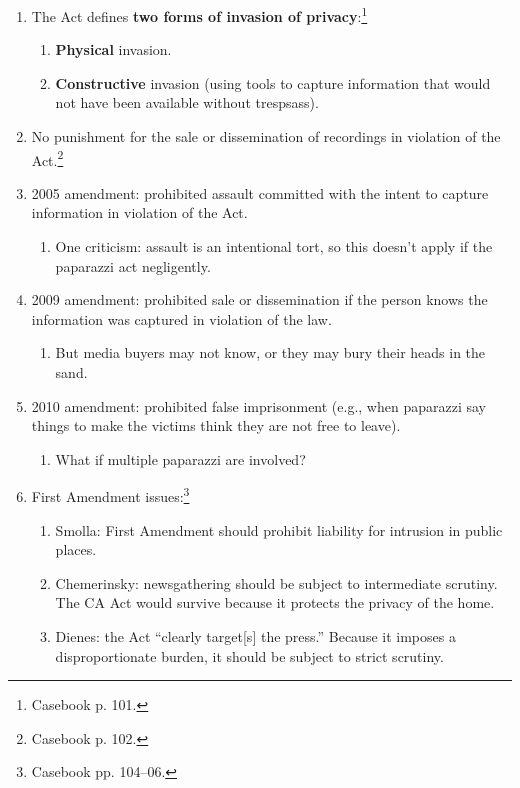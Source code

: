 \begin{enumerate}
    \item The Act defines \textbf{two forms of invasion of 
    privacy}:\footnote{Casebook p.  101.}
    \begin{enumerate}
        \item \textbf{Physical} invasion.
        \item \textbf{Constructive} invasion (using tools to capture information 
        that would not have been available without trespsass).
    \end{enumerate}
    \item No punishment for the sale or dissemination of recordings in violation 
    of the Act.\footnote{Casebook p. 102.}
    \item 2005 amendment: prohibited assault committed with the intent to 
    capture information in violation of the Act.
    \begin{enumerate}
        \item One criticism: assault is an intentional tort, so this doesn't 
        apply if the paparazzi act negligently.
    \end{enumerate}
    \item 2009 amendment: prohibited sale or dissemination if the person knows 
    the information was captured in violation of the law.
    \begin{enumerate}
        \item But media buyers may not know, or they may bury their heads in the 
        sand.
    \end{enumerate}
    \item 2010 amendment: prohibited false imprisonment (e.g., when paparazzi 
    say things to make the victims think they are not free to leave).
    \begin{enumerate}
        \item What if multiple paparazzi are involved?
    \end{enumerate}
    \item First Amendment issues:\footnote{Casebook pp. 104--06.}
    \begin{enumerate}
        \item Smolla: First Amendment should prohibit liability for intrusion in 
        public places.
        \item Chemerinsky: newsgathering should be subject to intermediate 
        scrutiny. The CA Act would survive because it protects the privacy of 
        the home.
        \item Dienes: the Act ``clearly target[s] the press.'' Because it 
        imposes a disproportionate burden, it should be subject to strict 
        scrutiny.
    \end{enumerate}
\end{enumerate}

